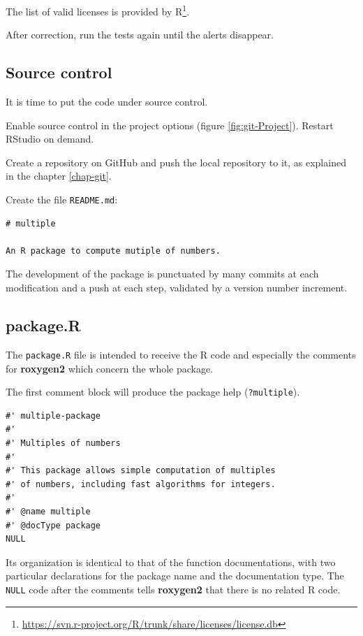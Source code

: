 \documentclass[
  12pt,
  american,
  a4paper,
  extrafontsizes,onecolumn,openright
  ]{memoir}
\begin{document}
\normalsize

The list of valid licenses is provided by R\footnote{\url{https://svn.r-project.org/R/trunk/share/licenses/license.db}}.

After correction, run the tests again until the alerts disappear.

\hypertarget{sec:package-cds}{%
\subsection{Source control}\label{sec:package-cds}}

It is time to put the code under source control.

Enable source control in the project options (figure \ref{fig:git-Project}).
Restart RStudio on demand.

Create a repository on GitHub and push the local repository to it, as explained in the chapter \ref{chap-git}.

Create the file \texttt{README.md}:

\begin{verbatim}
# multiple

An R package to compute mutiple of numbers.
\end{verbatim}

The development of the package is punctuated by many commits at each modification and a push at each step, validated by a version number increment.

\hypertarget{package.r}{%
\subsection{package.R}\label{package.r}}

The \texttt{package.R} file is intended to receive the R code and especially the comments for \textbf{roxygen2} which concern the whole package.

The first comment block will produce the package help (\texttt{?multiple}).

\begin{verbatim}
#' multiple-package
#'
#' Multiples of numbers
#' 
#' This package allows simple computation of multiples 
#' of numbers, including fast algorithms for integers.
#'
#' @name multiple
#' @docType package
NULL
\end{verbatim}

Its organization is identical to that of the function documentations, with two particular declarations for the package name and the documentation type.
The \texttt{NULL} code after the comments tells \textbf{roxygen2} that there is no related R code.
\end{document}
